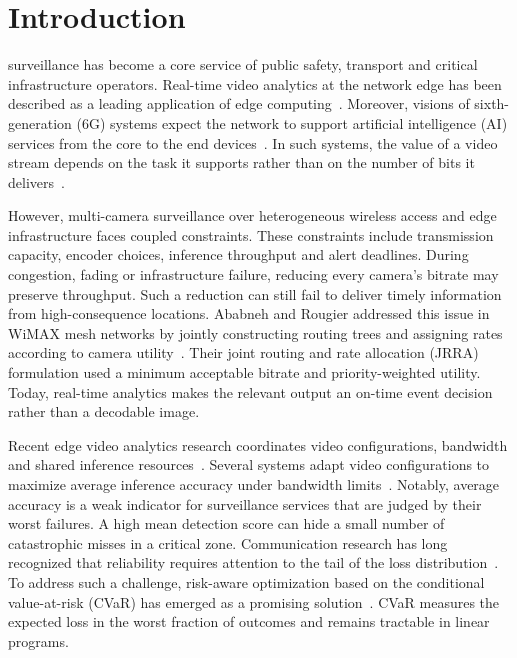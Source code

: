 \documentclass[letterpaper,journal]{IEEEtran}
\begin{document}
\section{Introduction}
 surveillance has become a core service of public safety, transport and critical infrastructure operators. Real-time video analytics at the network edge has been described as a leading application of edge computing~\cite{ananthanarayanan2017killer}. Moreover, visions of sixth-generation (6G) systems expect the network to support artificial intelligence (AI) services from the core to the end devices~\cite{letaief2019roadmap,saad2020vision}. In such systems, the value of a video stream depends on the task it supports rather than on the number of bits it delivers~\cite{strinati2021sixg,gunduz2023beyond}.

However, multi-camera surveillance over heterogeneous wireless access and edge infrastructure faces coupled constraints. These constraints include transmission capacity, encoder choices, inference throughput and alert deadlines. During congestion, fading or infrastructure failure, reducing every camera's bitrate may preserve throughput. Such a reduction can still fail to deliver timely information from high-consequence locations. Ababneh and Rougier addressed this issue in WiMAX mesh networks by jointly constructing routing trees and assigning rates according to camera utility~\cite{ababneh2012}. Their joint routing and rate allocation (JRRA) formulation used a minimum acceptable bitrate and priority-weighted utility. Today, real-time analytics makes the relevant output an on-time event decision rather than a decodable image.

Recent edge video analytics research coordinates video configurations, bandwidth and shared inference resources~\cite{chen2023survey}. Several systems adapt video configurations to maximize average inference accuracy under bandwidth limits~\cite{jiang2018chameleon,zhang2018awstream,wang2020joint,dai2025biswift}. Notably, average accuracy is a weak indicator for surveillance services that are judged by their worst failures. A high mean detection score can hide a small number of catastrophic misses in a critical zone. Communication research has long recognized that reliability requires attention to the tail of the loss distribution~\cite{bennis2018urllc}. To address such a challenge, risk-aware optimization based on the conditional value-at-risk (CVaR) has emerged as a promising solution~\cite{rockafellar2000,rockafellar2002}. CVaR measures the expected loss in the worst fraction of outcomes and remains tractable in linear programs.
\end{document}

